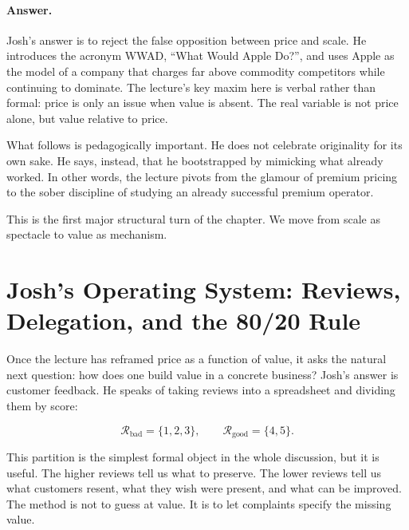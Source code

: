 \paragraph{Answer.} Josh's answer is to reject the false opposition between price and scale. He introduces the acronym WWAD, ``What Would Apple Do?'', and uses Apple as the model of a company that charges far above commodity competitors while continuing to dominate. The lecture's key maxim here is verbal rather than formal: price is only an issue when value is absent. The real variable is not price alone, but value relative to price.

What follows is pedagogically important. He does not celebrate originality for its own sake. He says, instead, that he bootstrapped by mimicking what already worked. In other words, the lecture pivots from the glamour of premium pricing to the sober discipline of studying an already successful premium operator.

This is the first major structural turn of the chapter. We move from scale as spectacle to value as mechanism.

\section{Josh's Operating System: Reviews, Delegation, and the 80/20 Rule}

Once the lecture has reframed price as a function of value, it asks the natural next question: how does one build value in a concrete business? Josh's answer is customer feedback. He speaks of taking reviews into a spreadsheet and dividing them by score:

\begin{equation}
\mathcal{R}_{\text{bad}} = \{1,2,3\}, \qquad
\mathcal{R}_{\text{good}} = \{4,5\}.
\end{equation}

This partition is the simplest formal object in the whole discussion, but it is useful. The higher reviews tell us what to preserve. The lower reviews tell us what customers resent, what they wish were present, and what can be improved. The method is not to guess at value. It is to let complaints specify the missing value.

